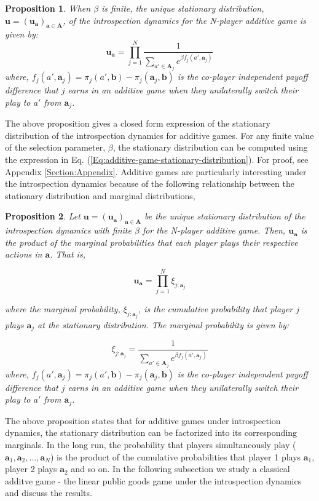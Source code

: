 \documentclass[11pt]{article}
\theoremstyle{plainCl1}
\newtheorem{Prop}{Proposition}
\theoremstyle{plainCl2}
\newcommand{\A}{\mathbf{A}}
\newcommand{\abf}{\mathbf{a}}
\newcommand{\bbf}{\mathbf{b}}
\newcommand{\ubf}{\mathbf{u}}
\begin{document}
 \begin{Prop}
When $\beta$ is finite, the unique stationary distribution, $\ubf = (\ubf_\abf)_{\abf \in \A}$, of the introspection dynamics for the N-player additive game is given by: 
\begin{equation}
\ubf_\abf = \prod_{j=1}^N \frac{1}{\displaystyle \sum_{a' \in \A_j} e^{\beta f_j(a', \abf_j)}} 
\label{Eq:additive-game-stationary-distribution}
\end{equation}
where, $f_j(a', \abf_j) = \pi_j(a', \bbf) - \pi_j(\abf_j, \bbf)$ is the co-player independent payoff difference that $j$  earns in an additive game when they unilaterally switch their play to $a'$ from $\abf_j$.
\label{Th:additive-games-stationary-dist}
\end{Prop}
\noindent The above proposition gives a closed form expression of the stationary distribution of the introspection dynamics for additive games. For any finite value of the selection parameter, $\beta$, the stationary distribution can be computed using the expression in Eq. (\ref{Eq:additive-game-stationary-distribution}). For proof, see Appendix \ref{Section:Appendix}. Additive games are particularly interesting under the introspection dynamics because of the following relationship between the stationary distribution and marginal distributions,


\begin{Prop}
Let $\ubf = (\ubf_\abf)_{\abf \in \A}$ be the unique stationary distribution of the introspection dynamics with finite $\beta$ for the N-player additive game. Then, $\ubf_\abf$ is the product of the marginal probabilities that each player plays their respective actions in $\abf$. That is, 

\begin{equation}
\ubf_\abf = \prod_{j = 1}^N \xi_{j:\abf_j}
\label{Eq:additive-game-products}
\end{equation}

\noindent where the marginal probability, $\xi_{j:\abf_j}$, is the cumulative probability that player $j$ plays $\abf_j$ at the stationary distribution. The marginal probability is given by: 

\begin{equation}
\xi_{j:\abf_j} = \frac{1}{\displaystyle \sum_{a' \in \A_j} e^{\beta f_j(a', \abf_j)}} 
\label{Eq:marginal-at-additive-game}
\end{equation}
\noindent where, $f_j(a', \abf_j) = \pi_j(a', \bbf) - \pi_j(\abf_j, \bbf)$ is the co-player independent payoff difference that $j$  earns in an additive game when they unilaterally switch their play to $a'$ from $\abf_j$.
\label{Th:additive-game-product-of-marginals}
\end{Prop}
\noindent The above proposition states that for additive games under introspection dynamics, the stationary distribution can be factorized into its corresponding marginals. In the long run, the probability that players simultaneously play ($\abf_1, \abf_2, ...,\abf_N$) is the product of the cumulative probabilities that player 1 plays $\abf_1$, player 2 plays $\abf_2$ and so on. In the following subsection we study a classical additve game - the linear public goods game under the introspection dynamics and discuss the results. 
\end{document}
